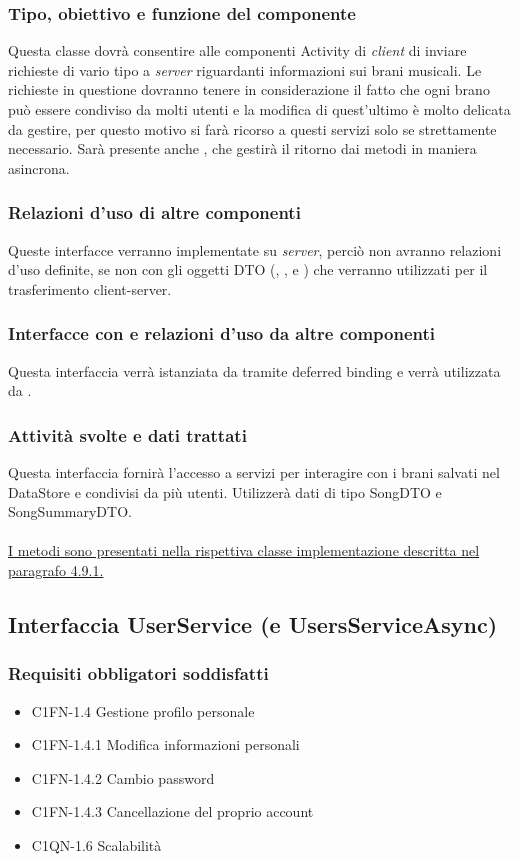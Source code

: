 \subsubsection*{Tipo, obiettivo e funzione del componente}
Questa classe dovr\`a consentire alle componenti Activity di \emph{client} di
inviare richieste di vario tipo a \emph{server} riguardanti informazioni sui
brani musicali. Le richieste in questione dovranno tenere in considerazione il
fatto che ogni brano pu\`o essere condiviso da molti utenti e la modifica di
quest'ultimo \`e molto delicata da gestire, per questo motivo si far\`a ricorso a
questi servizi solo se strettamente necessario. Sar\`a presente anche
, che gestir\`a il ritorno dai metodi in maniera asincrona. \subsubsection*{Relazioni d'uso di altre componenti}
Queste interfacce verranno implementate su \emph{server}, perci\`o non
avranno relazioni d'uso definite, se non con gli oggetti DTO
(, ,  e
) che verranno utilizzati per il trasferimento
client-server. \subsubsection*{Interfacce con e relazioni d'uso da altre componenti}
Questa interfaccia verr\`a istanziata da  tramite deferred
binding e verr\`a utilizzata da .
\subsubsection*{Attivit\`a svolte e dati trattati}
Questa interfaccia fornir\`a l'accesso a servizi per interagire con i brani
salvati nel DataStore e condivisi da pi\`u utenti. Utilizzer\`a dati di tipo
SongDTO e SongSummaryDTO.\\\\ \underline{I metodi sono presentati nella
rispettiva classe implementazione descritta nel paragrafo 4.9.1.}

\subsection{Interfaccia UserService (e UsersServiceAsync)}
\subsubsection*{Requisiti obbligatori soddisfatti}
\begin{itemize}
	\item C1FN-1.4 Gestione profilo personale
	\item C1FN-1.4.1 Modifica informazioni personali
	\item C1FN-1.4.2 Cambio password
	\item C1FN-1.4.3 Cancellazione del proprio account
    \item C1QN-1.6 Scalabilit\`a
\end{itemize}
